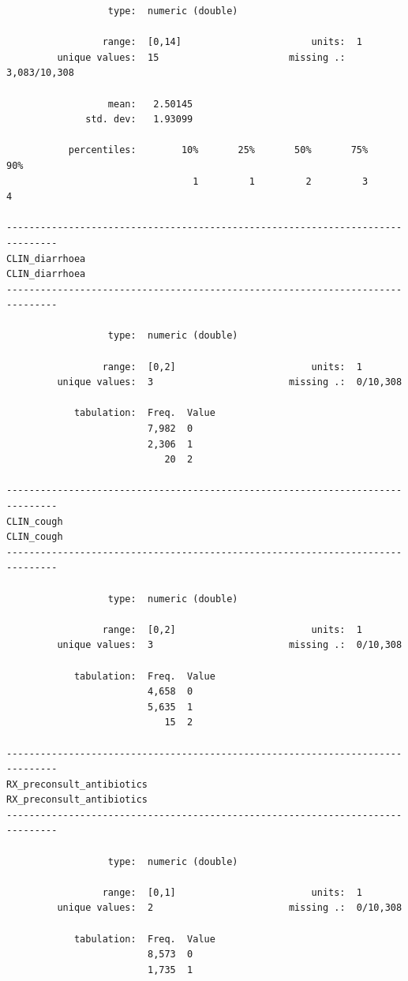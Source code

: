 \documentclass[
  letterpaper,
  DIV=11,
  numbers=noendperiod,
  oneside]{scrreprt}
\begin{document}
\begin{verbatim}
                  type:  numeric (double)

                 range:  [0,14]                       units:  1
         unique values:  15                       missing .:  3,083/10,308

                  mean:   2.50145
              std. dev:   1.93099

           percentiles:        10%       25%       50%       75%       90%
                                 1         1         2         3         4

-------------------------------------------------------------------------------
CLIN_diarrhoea                                                   CLIN_diarrhoea
-------------------------------------------------------------------------------

                  type:  numeric (double)

                 range:  [0,2]                        units:  1
         unique values:  3                        missing .:  0/10,308

            tabulation:  Freq.  Value
                         7,982  0
                         2,306  1
                            20  2

-------------------------------------------------------------------------------
CLIN_cough                                                           CLIN_cough
-------------------------------------------------------------------------------

                  type:  numeric (double)

                 range:  [0,2]                        units:  1
         unique values:  3                        missing .:  0/10,308

            tabulation:  Freq.  Value
                         4,658  0
                         5,635  1
                            15  2

-------------------------------------------------------------------------------
RX_preconsult_antibiotics                             RX_preconsult_antibiotics
-------------------------------------------------------------------------------

                  type:  numeric (double)

                 range:  [0,1]                        units:  1
         unique values:  2                        missing .:  0/10,308

            tabulation:  Freq.  Value
                         8,573  0
                         1,735  1


\end{verbatim}
\end{document}
